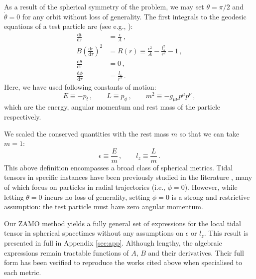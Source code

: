 \documentclass[
    reprint,
    prd,
    nofootinbib,
    amsmath,amssymb,
    aps,
    floatfix,
]{revtex4-2}
\begin{document}
As a result of the spherical symmetry of the problem, we may set $\theta = \pi/2$ and $\dot{\theta} = 0$ for any orbit without loss of generality. The first integrals to the geodesic equations of a test particle are (see e.g., \cite{Chandrasekhar1998}):
\begin{equation}
    \begin{split}
        \frac{\mathrm{d}t}{\mathrm{d}\tau} &= \frac{\epsilon}{A} \, , \\
        B\left( \frac{\mathrm{d}r}{\mathrm{d}\tau} \right)^{2} &= R(r) \equiv \frac{\epsilon^{2}}{A} - \frac{l_{z}^{2}}{r^{2}} - 1 \, , \\
        \frac{\mathrm{d}\theta}{\mathrm{d}\tau} &= 0 \, , \\
        \frac{\mathrm{d}\phi}{\mathrm{d}\tau} &= \frac{l_{z}}{r^{2}} \, .
    \end{split}
    \label{eq:spherical_geodesics}
\end{equation}
Here, we have used following constants of motion:
\begin{equation}
    E \equiv -p_{t} \, , \qquad L \equiv p_{\phi} \, , \qquad m^{2} \equiv -g_{\mu \nu} p^{\mu} p^{\nu} \, ,
\end{equation}
which are the energy, angular momentum and rest mass of the particle respectively.

We scaled the conserved quantities with the rest mass $m$ so that we can take $m = 1$:
\begin{equation}
    \epsilon \equiv \frac{E}{m} \, , \qquad l_{z} \equiv \frac{L}{m} \, .
\end{equation}
This above definition encompasses a broad class of spherical metrics. Tidal tensors in specific instances have been previously studied in the literature \citep[e.g.,][]{Crispino2016, Sharif2018, Hong2020, Vandeev2021, Vandeev2022, Lima2022, Arora2024}, many of which focus on particles in radial trajectories (i.e., $\dot{\phi} = 0$). However, while letting $\dot{\theta} = 0$ incurs no loss of generality, setting $\dot{\phi} = 0$ is a strong and restrictive assumption: the test particle must have zero angular momentum.

Our ZAMO method yields a fully general set of expressions for the local tidal tensor in spherical spacetimes without any assumptions on $\epsilon$ or $l_{z}$. This result is presented in full in Appendix \ref{sec:app}. Although lengthy, the algebraic expressions remain tractable functions of $A$, $B$ and their derivatives. Their full form has been verified to reproduce the works cited above when specialised to each metric.
\end{document}
